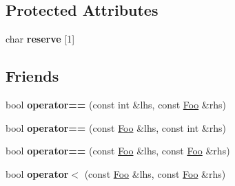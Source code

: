 \subsection*{Protected Attributes}
\begin{DoxyCompactItemize}
\item 
\hypertarget{structFoo_a04a9e98be444e478de473945fa787a0a}{}char {\bfseries reserve} \mbox{[}1\mbox{]}\label{structFoo_a04a9e98be444e478de473945fa787a0a}

\end{DoxyCompactItemize}
\subsection*{Friends}
\begin{DoxyCompactItemize}
\item 
\hypertarget{structFoo_a2e38440e26d83b4f1b2a7488fc00b804}{}bool {\bfseries operator==} (const int \&lhs, const \hyperlink{structFoo}{Foo} \&rhs)\label{structFoo_a2e38440e26d83b4f1b2a7488fc00b804}

\item 
\hypertarget{structFoo_ae139dc7a99be057479cef877b3bea9e2}{}bool {\bfseries operator==} (const \hyperlink{structFoo}{Foo} \&lhs, const int \&rhs)\label{structFoo_ae139dc7a99be057479cef877b3bea9e2}

\item 
\hypertarget{structFoo_aa7aee4ff084db38830ff29bb98cbd1b0}{}bool {\bfseries operator==} (const \hyperlink{structFoo}{Foo} \&lhs, const \hyperlink{structFoo}{Foo} \&rhs)\label{structFoo_aa7aee4ff084db38830ff29bb98cbd1b0}

\item 
\hypertarget{structFoo_a9394bf5b72d1eeb1b0af928a40308808}{}bool {\bfseries operator$<$} (const \hyperlink{structFoo}{Foo} \&lhs, const \hyperlink{structFoo}{Foo} \&rhs)\label{structFoo_a9394bf5b72d1eeb1b0af928a40308808}

\end{DoxyCompactItemize}


